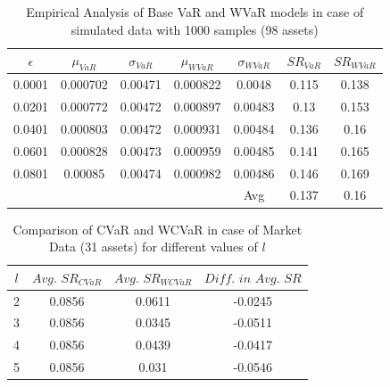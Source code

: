 \documentclass[12pt]{article}
\numberwithin{equation}{section}
\begin{document}
\begin{table}[!h]
\centering
\captionsetup{justification=centering}
\begin{tabular}{||c|c|c|c|c|c|c||}
\hline
$\epsilon$ & $\mu_{VaR}$ & $\sigma_{VaR}$ & $\mu_{WVaR}$ & $\sigma_{WVaR}$ & $SR_{VaR}$ & $SR_{WVaR}$\\
\hline
0.0001 & 0.000702 & 0.00471 & 0.000822 & 0.0048 & 0.115 & 0.138 \\
0.0201 & 0.000772 & 0.00472 & 0.000897 & 0.00483 & 0.13 & 0.153 \\
0.0401 & 0.000803 & 0.00472 & 0.000931 & 0.00484 & 0.136 & 0.16 \\
0.0601 & 0.000828 & 0.00473 & 0.000959 & 0.00485 & 0.141 & 0.165 \\
0.0801 & 0.00085 & 0.00474 & 0.000982 & 0.00486 & 0.146 & 0.169 \\
\hline
& & & & Avg & 0.137 & 0.16 \\
\hline
\end{tabular}
\caption{Empirical Analysis of Base VaR and WVaR models in case of simulated data with 1000 samples (98 assets)}
\label{tab:5.6}
\end{table}

\begin{table}[!h]
    \centering
    \captionsetup{justification=centering}

   \begin{tabular}{||c|c|c|c||}
   \hline
  
$l$ & $Avg. \, \, SR_{CVaR}$ & $Avg. \, \, SR_{WCVaR}$ & $Diff. \, \, in \, \, Avg. \, \, SR$ \\
  
  \hline
2 & 0.0856 & 0.0611 & -0.0245 \\
3 & 0.0856 & 0.0345 & -0.0511 \\
4 & 0.0856 & 0.0439 & -0.0417 \\
5 & 0.0856 & 0.031 & -0.0546 \\
  \hline
\end{tabular}
    \caption{Comparison of CVaR and WCVaR in case of Market Data (31 assets) for different values of $l$}
    \label{avgtab:6.1}
\end{table}
\end{document}
